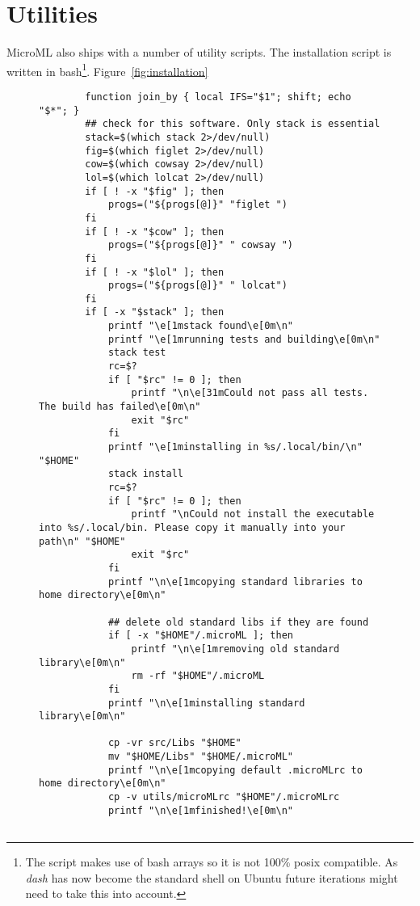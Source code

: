 \section{Utilities}
MicroML also ships with a number of utility scripts.
The installation script is written in bash\footnote{The script makes use of bash arrays so it is not
100\% posix compatible. As \textit{dash} has now become the standard shell on Ubuntu future
iterations might need to take this into account.}. Figure~\ref{fig:installation}
\begin{figure}
    \begin{verbatim}
        function join_by { local IFS="$1"; shift; echo "$*"; }
        ## check for this software. Only stack is essential
        stack=$(which stack 2>/dev/null) 
        fig=$(which figlet 2>/dev/null)
        cow=$(which cowsay 2>/dev/null)
        lol=$(which lolcat 2>/dev/null)
        if [ ! -x "$fig" ]; then
            progs=("${progs[@]}" "figlet ")
        fi
        if [ ! -x "$cow" ]; then
            progs=("${progs[@]}" " cowsay ")
        fi
        if [ ! -x "$lol" ]; then
            progs=("${progs[@]}" " lolcat")
        fi
        if [ -x "$stack" ]; then
            printf "\e[1mstack found\e[0m\n"
            printf "\e[1mrunning tests and building\e[0m\n"
            stack test 
            rc=$?
            if [ "$rc" != 0 ]; then
                printf "\n\e[31mCould not pass all tests. The build has failed\e[0m\n"
                exit "$rc" 
            fi
            printf "\e[1minstalling in %s/.local/bin/\n" "$HOME"
            stack install
            rc=$?
            if [ "$rc" != 0 ]; then
                printf "\nCould not install the executable into %s/.local/bin. Please copy it manually into your path\n" "$HOME"
                exit "$rc"
            fi
            printf "\n\e[1mcopying standard libraries to home directory\e[0m\n"

            ## delete old standard libs if they are found
            if [ -x "$HOME"/.microML ]; then
                printf "\n\e[1mremoving old standard library\e[0m\n"
                rm -rf "$HOME"/.microML
            fi
            printf "\n\e[1minstalling standard library\e[0m\n"

            cp -vr src/Libs "$HOME"
            mv "$HOME/Libs" "$HOME/.microML"
            printf "\n\e[1mcopying default .microMLrc to home directory\e[0m\n"
            cp -v utils/microMLrc "$HOME"/.microMLrc
            printf "\n\e[1mfinished!\e[0m\n"


\end{verbatim}
\end{figure}
